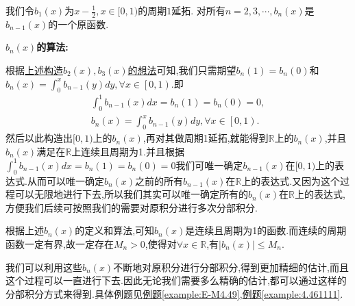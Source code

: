 \documentclass[lang=cn,newtx,10pt,scheme=chinese]{elegantbook}
\begin{document}
\begin{definition}[\(b_n(x)\)定义和算法]\label{definition:b_n(x)定义和算法}
   我们令\(b_1(x)\)为\(x-\frac{1}{2},x\in[0,1)\)的周期\(1\)延拓. 对所有\(n=2,3,\cdots,b_n(x)\)是\(b_{n - 1}(x)\)的一个原函数.
\end{definition}
\begin{note}
   \textbf{\(b_n(x)\)的算法:}

   根据\hyperlink{remark:利用0阶E-M公式精细估阶的构造}{上述构造$b_2(x),b_3(x)$的想法}可知,我们只需期望\(b_n(1)=b_n(0)\)和$b_n(x)=\int_0^x{b_{n-1}\left( y \right) dy},\forall x\in \left[ 0,1 \right) $.即
   \begin{gather*}
      \int_{0}^{1}b_{n-1}(x)dx =b_n(1)=b_n(0)= 0,
      \\
      b_n(x)=\int_0^x{b_{n-1}\left( y \right) dy},\forall x\in \left[ 0,1 \right).
   \end{gather*}
   然后以此构造出$[0,1)$上的$b_n(x)$,再对其做周期1延拓,就能得到$\mathbb{R}$上的$b_n(x)$,并且$b_n(x)$满足在$\mathbb{R}$上连续且周期为1.并且根据$\int_{0}^{1}b_{n-1}(x)dx =b_n(1)=b_n(0)= 0$我们可唯一确定\(b_{n-1}(x)\)在\([0,1)\)上的表达式.从而可以唯一确定$b_n(x)$之前的所有\(b_{n-1}(x)\)在\(\mathbb{R}\)上的表达式.又因为这个过程可以无限地进行下去,所以我们其实可以唯一确定所有的\(b_n(x)\)在\(\mathbb{R}\)上的表达式,方便我们后续可按照我们的需要对原积分进行多次分部积分.

   根据上述$b_n(x)$的定义和算法,可知$b_n(x)$是连续且周期为1的函数.而连续的周期函数一定有界,故一定存在$M_n>0$,使得对$\forall x\in \mathbb{R}$,有$\left| b_n(x) \right|\leqslant M_n$.
\end{note}
\begin{remark}
   我们可以利用这些$b_n(x)$不断地对原积分进行分部积分,得到更加精细的估计,而且这个过程可以一直进行下去.因此无论我们需要多么精确的估计,都可以通过这样的分部积分方式来得到.具体例题见\hyperref[example:E-M4.49]{例题\ref{example:E-M4.49}},\hyperref[example:4.461111]{例题\ref{example:4.461111}}.
\end{remark}
\end{document}

